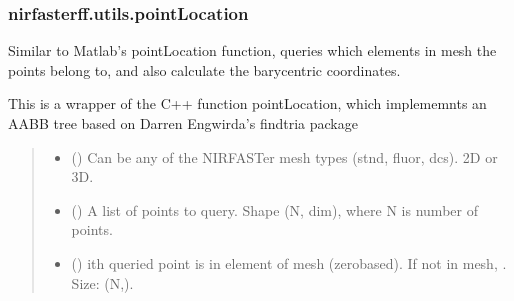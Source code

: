 \documentclass[letterpaper,10pt,english]{sphinxmanual}
\begin{document}
\sphinxstepscope


\subsubsection{nirfasterff.utils.pointLocation}
\label{\detokenize{_autosummary/nirfasterff.utils.pointLocation:nirfasterff-utils-pointlocation}}\label{\detokenize{_autosummary/nirfasterff.utils.pointLocation::doc}}

\begin{fulllineitems}
\label{\detokenize{_autosummary/nirfasterff.utils.pointLocation:nirfasterff.utils.pointLocation}}
\pysigstartsignatures
{}
\pysigstopsignatures
\sphinxAtStartPar
Similar to Matlab’s pointLocation function, queries which elements in mesh the points belong to, and also calculate the barycentric coordinates.

\sphinxAtStartPar
This is a wrapper of the C++ function pointLocation, which implememnts an AABB tree based on Darren Engwirda’s findtria package
\begin{quote}\begin{description}
\begin{itemize}
\item {} 
\sphinxAtStartPar
{} () \textendash{} Can be any of the NIRFASTer mesh types (stnd, fluor, dcs). 2D or 3D.

\item {} 
\sphinxAtStartPar
{} () \textendash{} A list of points to query. Shape (N, dim), where N is number of points.

\end{itemize}

\sphinxAtStartPar
\begin{itemize}
\item {} 
\sphinxAtStartPar
{} () \textendash{} i\sphinxhyphen{}th queried point is in element  of mesh (zero\sphinxhyphen{}based). If not in mesh, . Size: (N,).


\end{itemize}
\end{description}
\end{quote}
\end{fulllineitems}
\end{document}

